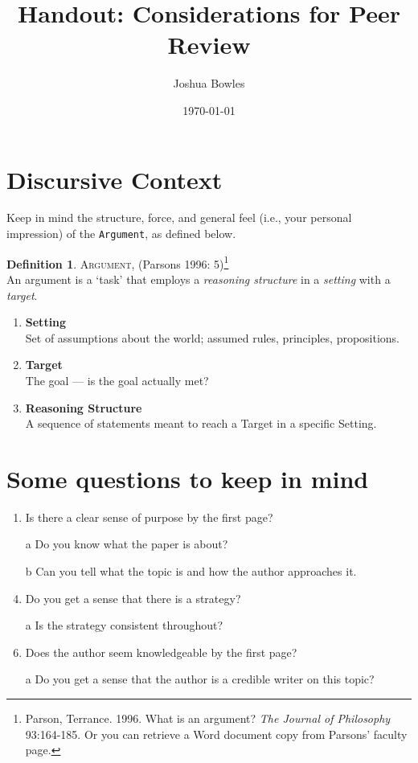 \documentclass[11pt,twoside,letterpaper]{article}
\theoremstyle{definition}
\newtheorem{definition}{Definition}
\begin{document}
\author{Joshua Bowles}
\title{Handout: Considerations for Peer Review}
\date{\today}


\maketitle



\section{Discursive Context}
Keep in mind the structure, force, and general feel (i.e., your personal impression) of the \texttt{Argument}, as defined below.

\begin{definition} \textsc{Argument}, (Parsons 1996: 5)\footnote{Parson, Terrance. 1996. What is an argument? {\sl The Journal of Philosophy} 93:164-185. Or you can retrieve a Word document copy from Parsons' faculty page.}\\
An argument is a `task' that employs a {\sl reasoning structure} in a {\sl setting} with a {\sl target}.
\end{definition}

\begin{enumerate}
\item \textbf{Setting}\\
Set of assumptions about the world; assumed rules, principles, propositions.

\item \textbf{Target}\\
The goal --- is the goal actually met?

\item \textbf{Reasoning Structure}\\
A sequence of statements meant to reach a {\sc Target} in a specific {\sc Setting}.
\end{enumerate}

\section{Some questions to keep in mind}
\begin{enumerate}
\item Is there a clear sense of purpose by the first page?
\item[a] Do you know what the paper is about?
\item[b] Can you tell what the topic is and how the author approaches it.

\item Do you get a sense that there is a strategy?
\item[a] Is the strategy consistent throughout?

\item Does the author seem knowledgeable by the first page?
\item[a]  Do you get a sense that the author is a credible writer on this topic?
\end{enumerate}
\end{document}
